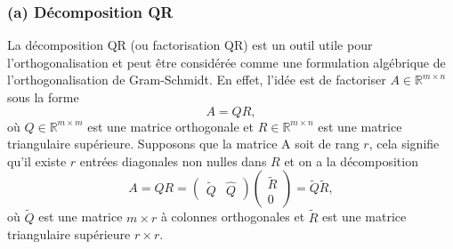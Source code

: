 \documentclass[11pt,a4paper,oneside]{book}
\def\R{\mathbb R}
\begin{document}
\subsubsection*{(a) Décomposition QR}
La décomposition QR (ou \og factorisation QR\fg) est un outil utile pour l'orthogonalisation  et peut être considérée comme une formulation algébrique de l'orthogonalisation de Gram-Schmidt. En effet, l'idée est de factoriser $ A \in\R^{m\times n} $ sous la forme 
\begin{equation}
A=QR,
\end{equation} où $ Q\in\R^{m\times m} $ est une matrice orthogonale et $ R\in\R^{m\times n} $ est une matrice triangulaire supérieure. Supposons que la matrice A soit de rang $ r $, cela signifie qu'il existe $ r $ entrées diagonales non nulles dans $ R $  et on a la décomposition 
\begin{equation*}
A=QR=\begin{pmatrix}
\tilde{Q}&\hat{Q}
\end{pmatrix}\begin{pmatrix}
\tilde{R}\\0
\end{pmatrix}=\tilde{Q}\tilde{R},
\end{equation*}
où $ \tilde{Q} $ est une matrice $ m\times r $ à colonnes orthogonales et $ \tilde{R} $ est une matrice triangulaire supérieure $ r\times r $.
\end{document}
